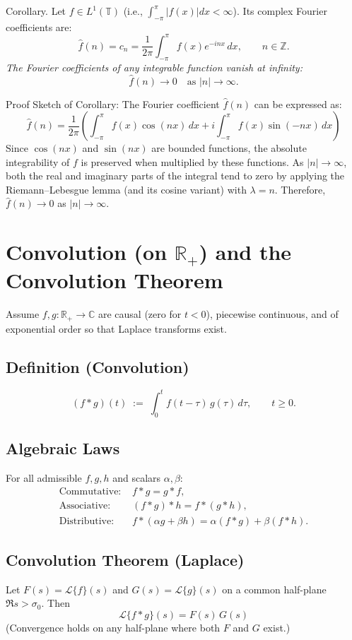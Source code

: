 \documentclass[12pt]{article}
\begin{document}
\noindent Corollary.
Let $f \in L^1(\mathbb{T})$ (i.e., $\int_{-\pi}^{\pi} |f(x)| dx < \infty$). Its complex Fourier coefficients are:
\[
  \hat{f}(n) = c_n = \frac{1}{2\pi}\int_{-\pi}^{\pi} f(x)e^{-inx}\,dx, \qquad n\in\mathbb{Z}.
\]
\emph{The Fourier coefficients of any integrable function vanish at infinity:}
\[
  \hat{f}(n) \longrightarrow 0 \quad \text{as } |n| \to \infty.
\]

Proof Sketch of Corollary:
The Fourier coefficient $\hat{f}(n)$ can be expressed as:
$$\hat{f}(n) = \frac{1}{2\pi} \left( \int_{-\pi}^{\pi} f(x) \cos(nx) \, dx + i \int_{-\pi}^{\pi} f(x) \sin(-nx) \, dx \right)$$
Since $\cos(nx)$ and $\sin(nx)$ are bounded functions, the absolute integrability of $f$ is preserved when multiplied by these functions. As $|n| \to \infty$, both the real and imaginary parts of the integral tend to zero by applying the Riemann--Lebesgue lemma (and its cosine variant) with $\lambda = n$. Therefore, $\hat{f}(n) \to 0$ as $|n| \to \infty$.

\section*{Convolution (on $\mathbb{R}_+$) and the Convolution Theorem}

\noindent
Assume $f,g:\mathbb{R}_+\to\mathbb{C}$ are causal (zero for $t<0$), piecewise continuous, and of exponential order so that Laplace transforms exist.

\subsection*{Definition (Convolution)}
\[
(f*g)(t)\;:=\;\int_{0}^{t} f(t-\tau)\,g(\tau)\,d\tau,\qquad t\ge 0.
\]

\subsection*{Algebraic Laws}
For all admissible $f,g,h$ and scalars $\alpha,\beta$:
\begin{align*}
\text{Commutative: }& f*g = g*f,\\
\text{Associative: }& (f*g)*h = f*(g*h),\\
\text{Distributive: }& f*(\alpha g+\beta h) = \alpha(f*g)+\beta(f*h).
\end{align*}

\subsection*{Convolution Theorem (Laplace)}
Let $F(s)=\mathcal{L}\{f\}(s)$ and $G(s)=\mathcal{L}\{g\}(s)$ on a common half-plane $\Re s>\sigma_0$. Then
\[
\;\mathcal{L}\{f*g\}(s)=F(s)\,G(s)\;
\]
(Convergence holds on any half-plane where both $F$ and $G$ exist.)
\end{document}
